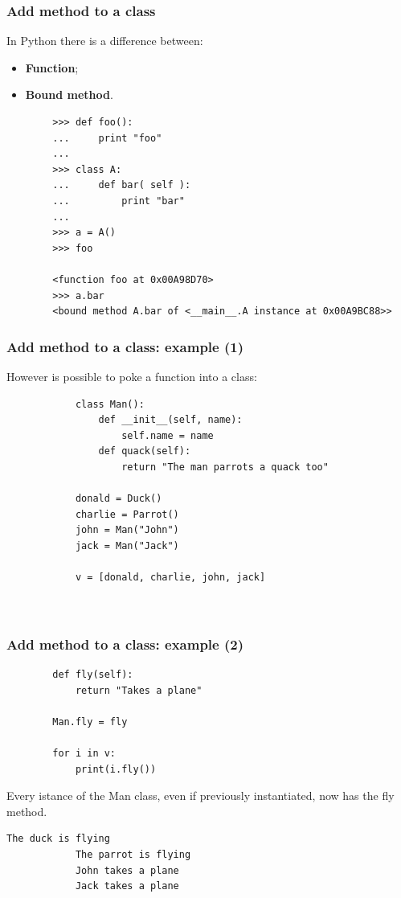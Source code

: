 \documentclass[xcolor ={table,usenames,dvipsnames}]{beamer}
\theoremstyle{definition}
\begin{document}
	\begin{frame}[fragile]
		\frametitle{Add method to a class}
			In Python there is a difference between:
		\begin{itemize}
			\item \textbf{Function};
			\item \textbf{Bound method}.
		\end{itemize}
		
		
		\begin{lstlisting}
		>>> def foo():
		...     print "foo"
		...
		>>> class A:
		...     def bar( self ):
		...         print "bar"
		...
		>>> a = A()
		>>> foo
		
		<function foo at 0x00A98D70>
		>>> a.bar
		<bound method A.bar of <__main__.A instance at 0x00A9BC88>>
		\end{lstlisting}
		
	\end{frame}
	
	\begin{frame}[fragile]
		\frametitle{Add method to a class: example (1)}
		However is possible to poke a function into a class:
		\begin{lstlisting}	
			class Man():
				def __init__(self, name):
					self.name = name
				def quack(self):
					return "The man parrots a quack too"
			
			donald = Duck()
			charlie = Parrot()
			john = Man("John")
			jack = Man("Jack")
			
			v = [donald, charlie, john, jack]
					
			
		\end{lstlisting}
	\end{frame}
	
	\begin{frame}[fragile]
		\frametitle{Add method to a class: example (2)}
		\begin{lstlisting}
		def fly(self):
			return "Takes a plane"
		
		Man.fly = fly
		
		for i in v:
			print(i.fly())
		\end{lstlisting}
		Every istance of the Man class, even if previously instantiated, now has the fly method.
		\begin{lstlisting}[basicstyle=\fontsize{2}{4}\selectfont\ttfamily\tiny,keywordstyle=\color{black},
		commentstyle=\color{black},
		stringstyle=\color{black}.]	
			The duck is flying
			The parrot is flying
			John takes a plane
			Jack takes a plane
		\end{lstlisting}
	\end{frame}
\end{document}
